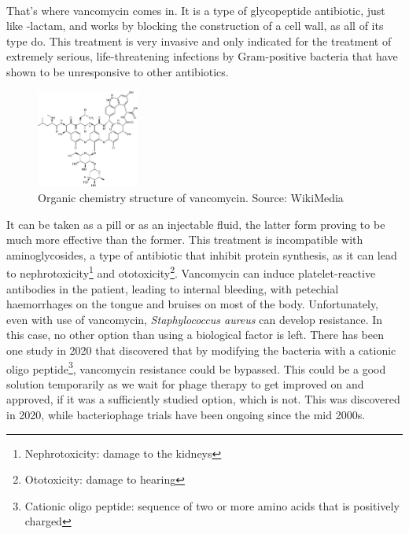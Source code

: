 \paragraph{}That's where vancomycin comes in. It is a type of glycopeptide antibiotic, just like \beta-lactam, and works by blocking the construction of a cell wall, as all of its type do. This treatment is very invasive and only indicated for the treatment of extremely serious, life-threatening infections by Gram-positive bacteria that have shown to be unresponsive to other antibiotics.\begin{figure}\begin{center}\includegraphics[width=0.30\textwidth]{assets/vancomycin.png}\end{center}\caption{Organic chemistry structure of vancomycin. Source: WikiMedia}\vspace{0.15\linewidth}\end{figure}\newline It can be taken as a pill or as an injectable fluid, the latter form proving to be much more effective than the former. This treatment is incompatible with aminoglycosides, a type of antibiotic that inhibit protein synthesis, as it can lead to nephrotoxicity\footnote{Nephrotoxicity: damage to the kidneys} and ototoxicity\footnote{Ototoxicity: damage to hearing}. Vancomycin can induce platelet-reactive antibodies in the patient, leading to internal bleeding, with petechial haemorrhages on the tongue and bruises on most of the body. Unfortunately, even with use of vancomycin, \emph{Staphylococcus aureus} can develop resistance. In this case, no other option than using a biological factor is left. There has been one study in 2020 that discovered that by modifying the bacteria with a cationic oligo peptide\footnote{Cationic oligo peptide: sequence of two or more amino acids that is positively charged}, vancomycin resistance could be bypassed. This could be a good solution temporarily as we wait for phage therapy to get improved on and approved, if it was a sufficiently studied option, which is not. This was discovered in 2020, while bacteriophage trials have been ongoing since the mid 2000s.
